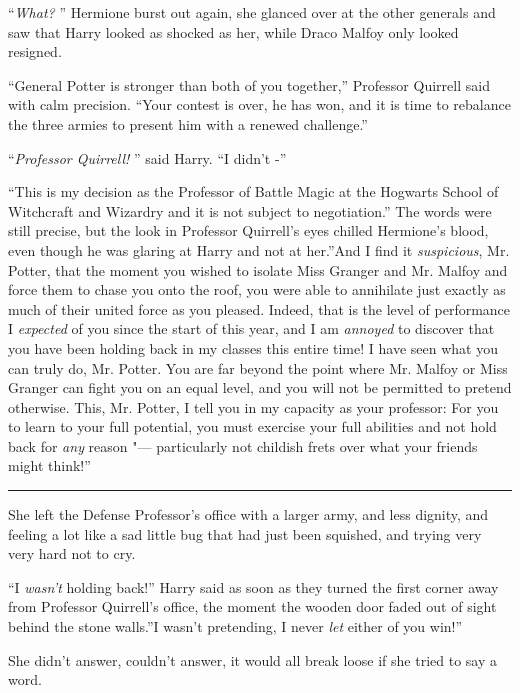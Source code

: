 ``\emph{What?} '' Hermione burst out again, she glanced over at the other
generals and saw that Harry looked as shocked as her, while Draco Malfoy
only looked resigned.

``General Potter is stronger than both of you together,'' Professor
Quirrell said with calm precision. ``Your contest is over, he has won,
and it is time to rebalance the three armies to present him with a
renewed challenge.''

``\emph{Professor Quirrell!} '' said Harry. ``I didn't -''

``This is my decision as the Professor of Battle Magic at the Hogwarts
School of Witchcraft and Wizardry and it is not subject to
negotiation.'' The words were still precise, but the look in Professor
Quirrell's eyes chilled Hermione's blood, even though he was glaring at
Harry and not at her.''And I find it \emph{suspicious}, Mr. Potter, that
the moment you wished to isolate Miss Granger and Mr. Malfoy and force
them to chase you onto the roof, you were able to annihilate just
exactly as much of their united force as you pleased. Indeed, that is
the level of performance I \emph{expected} of you since the start of
this year, and I am \emph{annoyed} to discover that you have been
holding back in my classes this entire time! I have seen what you can
truly do, Mr. Potter. You are far beyond the point where Mr. Malfoy or
Miss Granger can fight you on an equal level, and you will not be
permitted to pretend otherwise. This, Mr. Potter, I tell you in my
capacity as your professor: For you to learn to your full potential, you
must exercise your full abilities and not hold back for \emph{any}
reason "--- particularly not childish frets over what your friends might
think!''

\begin{center}\rule{3in}{0.4pt}\end{center}

She left the Defense Professor's office with a larger army, and less
dignity, and feeling a lot like a sad little bug that had just been
squished, and trying very very hard not to cry.

``I \emph{wasn't} holding back!'' Harry said as soon as they turned the
first corner away from Professor Quirrell's office, the moment the
wooden door faded out of sight behind the stone walls.''I wasn't
pretending, I never \emph{let} either of you win!''

She didn't answer, couldn't answer, it would all break loose if she
tried to say a word.


